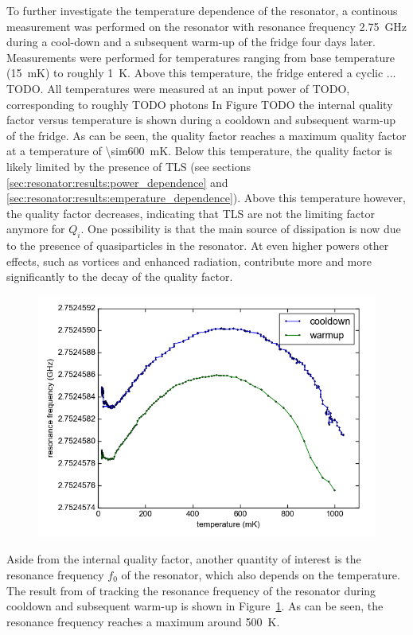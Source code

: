 \documentclass[12pt]{report}
\begin{document}
To further investigate the temperature dependence of the resonator, a continous measurement was performed on the resonator with resonance frequency \SI{2.75}{\giga \hertz} during a cool-down and a subsequent warm-up of the fridge four days later. Measurements were performed for temperatures ranging from base temperature (\SI{15}{\milli \kelvin}) to roughly \SI{1}{\kelvin}. Above this temperature, the fridge entered a cyclic ... TODO. All temperatures were measured at an input power of TODO, corresponding to roughly TODO photons In Figure TODO the internal quality factor versus temperature is shown during a cooldown and subsequent warm-up of the fridge. As can be seen, the quality factor reaches a maximum quality factor at a temperature of \SI{\sim600}{\milli \kelvin}. Below this temperature, the quality factor is likely limited by the presence of TLS (see sections \ref{sec:resonator:results:power_dependence} and \ref{sec:resonator:results:emperature_dependence}). Above this temperature however, the quality factor decreases, indicating that TLS are not the limiting factor anymore for $Q_i$. One possibility is that the main source of dissipation is now due to the presence of quasiparticles in the resonator. At even higher powers other effects, such as vortices and enhanced radiation, contribute more and more significantly to the decay of the quality factor.


\begin{figure}[h]
    \centering
    \includegraphics[width=.7\textwidth]{Figures/Temperature tracking - f0 vs T.png}
    \label{fig:temperature_tracking_f0}
\end{figure}


Aside from the internal quality factor, another quantity of interest is the resonance frequency $f_0$ of the resonator, which also depends on the temperature. The result from of tracking the resonance frequency of the resonator during cooldown and subsequent warm-up is shown in Figure~\ref{fig:temperature_tracking_f0}. As can be seen, the resonance frequency reaches a maximum around \SI{500}{\kelvin}.
\end{document}
